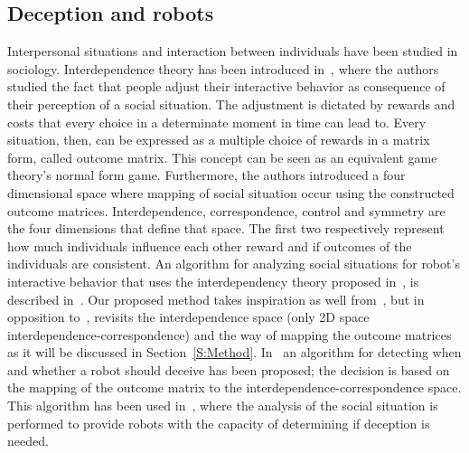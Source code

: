 \subsection{Deception and robots}
Interpersonal situations and interaction between individuals have been studied in sociology. Interdependence theory has been introduced in~\cite{de1980interpersonal}, where the authors studied the fact that people adjust their interactive behavior as consequence of their perception of a social situation. The adjustment is dictated by rewards and costs that every choice in a determinate moment in time can lead to. Every situation, then, can be expressed as a multiple choice of rewards in a matrix form, called outcome matrix. This concept can be seen as an equivalent game theory's normal form game. Furthermore, the authors introduced a four dimensional space where mapping of social situation occur using the constructed outcome matrices. Interdependence, correspondence, control and symmetry are the four dimensions that define that space. The first two respectively represent how much individuals influence each other reward and if outcomes of the individuals are consistent. 
An algorithm for analyzing social situations for robot's interactive behavior that uses the interdependency theory proposed in~\cite{de1980interpersonal}, is described in~\cite{wagner2008analyzing}. Our proposed method takes inspiration as well from~\cite{de1980interpersonal}, but in opposition to~\cite{wagner2008analyzing}, revisits the interdependence space (only 2D space interdependence-correspondence) and the way of mapping the outcome matrices as it will be discussed in Section~\ref{S:Method}.
In~\cite{wagner2009robot} an algorithm for detecting when and whether a robot should deceive has been proposed; the decision is based on the mapping of the outcome matrix to the interdependence-correspondence space. This algorithm has been used in~\cite{wagner2011acting}, where the analysis of the social situation is performed to provide robots with the capacity of determining if deception is needed. 

